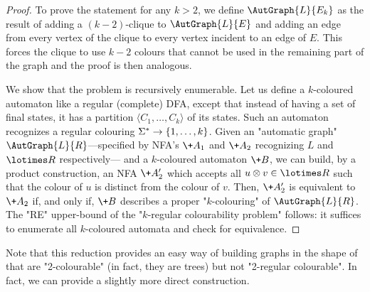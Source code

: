 \begin{proof}


    To prove the statement for any $k>2$, we define $\AutGraph{L}{E_k}$ as the result of adding a $(k-2)$-clique to $\AutGraph{L}{E}$ and adding an edge from every vertex of the clique to every vertex incident to an edge of $E$. This forces the clique to use $k-2$ colours that cannot be used in the remaining part of the graph and the proof is then analogous.

	 We show that the problem is recursively enumerable. Let us define a $k$-coloured automaton like a regular (complete) DFA, except that instead of having
	a set of final states, it has a partition $\langle C_1,\hdots,C_k \rangle$ of its states.
	Such an automaton recognizes a regular colouring $\Sigma^* \to \{1, \dotsc, k\}$.
	Given an "automatic graph" $\AutGraph{L}{R}$---specified by
	 NFA's $\+A_1$ and $\+A_2$ recognizing $L$ and $\lotimes R$  respectively--- and a $k$-coloured automaton $\+B$,
	we can build, by a product construction, an NFA $\+A'_2$  which accepts
	all $u \otimes v \in \lotimes R$ such that the colour of $u$ is distinct from the colour of $v$.
	Then, $\+A'_2$ is equivalent to $\+A_2$ if, and only if, $\+B$ describes a proper "$k$-colouring" 
	of $\AutGraph{L}{R}$. The "RE" upper-bound of the "$k$-regular colourability problem" follows: it 
	suffices to enumerate all $k$-coloured automata and check for equivalence.
\end{proof}

Note that this reduction provides an easy way of building
graphs in the shape of  that are "2-colourable" (in fact, they are trees) but not "2-regular colourable". In fact, we can provide a slightly more
direct construction.

